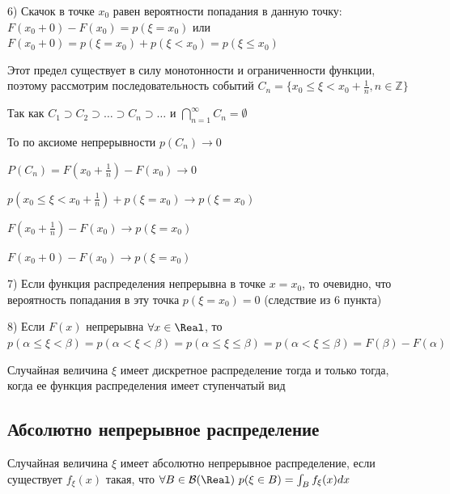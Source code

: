 \documentclass[12pt]{article}
\begin{document}
    6) Скачок в точке $x_0$ равен вероятности попадания в данную точку: $F(x_0 + 0) - F(x_0) = p(\xi = x_0)$ или $F(x_0 + 0) = p(\xi = x_0) + p(\xi < x_0) = p(\xi \leq x_0)$

    
    \begin{MyProof}
        Этот предел существует в силу монотонности и ограниченности функции, поэтому рассмотрим последовательность событий $C_n = \{x_0 \leq \xi < x_0 + \frac{1}{n}, n \in \mathbb{Z}\}$

        Так как $C_1 \supset C_2 \supset \dots \supset C_n \supset \dots$ и $\bigcap_{n = 1}^\infty C_n = \emptyset$

        То по аксиоме непрерывности $p(C_n) \to 0$

        $P(C_n) = F(x_0 + \frac{1}{n}) - F(x_0) \rightarrow 0$

        $p(x_0 \leq \xi < x_0 + \frac{1}{n}) + p(\xi = x_0) \rightarrow p(\xi = x_0)$

        $F(x_0 + \frac{1}{n}) - F(x_0) \to p(\xi = x_0)$

        $F(x_0 + 0) - F(x_0) \to p(\xi = x_0)$
    \end{MyProof}
    
    7) Если функция распределения непрерывна в точке $x = x_0$, то очевидно, что вероятность попадания в эту точка $p(\xi = x_0) = 0$ (следствие из 6 пункта)
    
    8) Если $F(x)$ непрерывна $\forall x \in \Real$, то $p(\alpha \leq \xi < \beta) = p(\alpha < \xi < \beta) = p(\alpha \leq \xi \leq \beta) = p(\alpha < \xi \leq \beta) = F(\beta) - F(\alpha)$
    
    \begin{MyTheorem}
        \Ths Случайная величина $\xi$ имеет дискретное распределение тогда и только тогда, когда ее функция распределения имеет ступенчатый вид
    \end{MyTheorem}

    \hypertarget{continuousdistributionproperties}{}

    \subsection{Абсолютно непрерывное распределение}

    \Def Случайная величина $\xi$ имеет абсолютно непрерывное распределение, если существует $f_\xi(x)$ такая, что $\forall B \in \mathcal{B}(\Real)
    \ p(\xi \in B) = \int_B f_\xi(x)dx$

    \hypertarget{densityfunctiondefinition}{}
\end{document}
